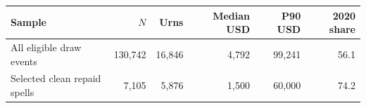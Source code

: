 \begin{tabular}{lrrrrr}
\toprule
Sample & $N$ & Urns & Median USD & P90 USD & 2020 share \\
\midrule
All eligible draw events & 130,742 & 16,846 & 4,792 & 99,241 & 56.1 \\
Selected clean repaid spells & 7,105 & 5,876 & 1,500 & 60,000 & 74.2 \\
\bottomrule
\end{tabular}
